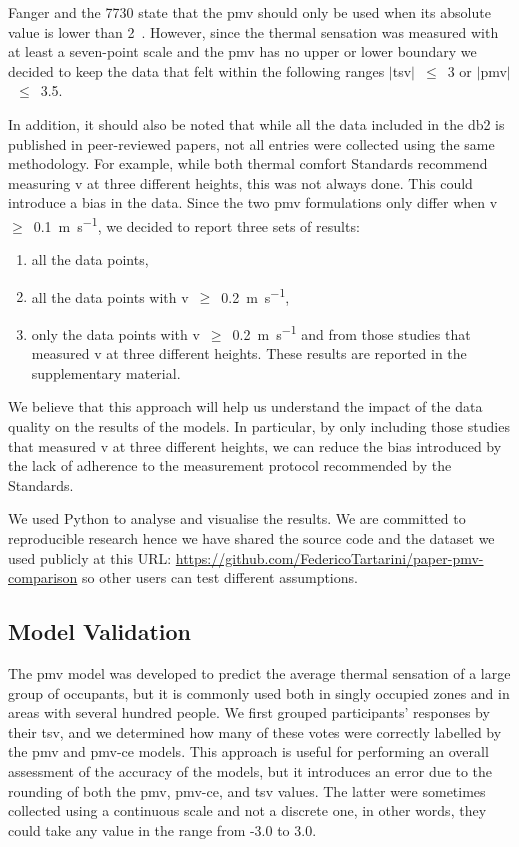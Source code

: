 Fanger and the \gls{7730} state that the \ac{pmv} should only be used when its absolute value is lower than 2~\cite{Fanger1970, iso7730}.
However, since the thermal sensation was measured with at least a seven-point scale and the \ac{pmv} has no upper or lower boundary we decided to keep the data that felt within the following ranges $|$\ac{tsv}$|$~$\leq$~\num{3} or $|$\ac{pmv}$|$~$\leq$~\num{3.5}.

In addition, it should also be noted that while all the data included in the \ac{db2} is published in peer-reviewed papers, not all entries were collected using the same methodology.
For example, while both thermal comfort Standards recommend measuring \ac{v} at three different heights, this was not always done.
This could introduce a bias in the data.
Since the two \ac{pmv} formulations only differ when \ac{v}~$\geq$~\qty{0.1}{\m\per\s}, we decided to report three sets of results:
\begin{enumerate}
    \item all the data points,
    \item all the data points with \ac{v}~$\geq$~\qty{0.2}{\m\per\s},
    \item only the data points with \ac{v}~$\geq$~\qty{0.2}{\m\per\s} and from those studies that measured \ac{v} at three different heights.
    These results are reported in the supplementary material.
\end{enumerate}
We believe that this approach will help us understand the impact of the data quality on the results of the models.
In particular, by only including those studies that measured \ac{v} at three different heights, we can reduce the bias introduced by the lack of adherence to the measurement protocol recommended by the Standards.

We used Python to analyse and visualise the results.
We are committed to reproducible research hence we have shared the source code and the dataset we used publicly at this URL: \url{https://github.com/FedericoTartarini/paper-pmv-comparison} so other users can test different assumptions.

\subsection{Model Validation}\label{subsec:model-validation}
The \ac{pmv} model was developed to predict the average thermal sensation of a large group of occupants, but it is commonly used both in singly occupied zones and in areas with several hundred people.
We first grouped participants' responses by their \ac{tsv}, and we determined how many of these votes were correctly labelled by the \ac{pmv} and \ac{pmv-ce} models.
This approach is useful for performing an overall assessment of the accuracy of the models, but it introduces an error due to the rounding of both the \ac{pmv}, \ac{pmv-ce}, and \ac{tsv} values.
The latter were sometimes collected using a continuous scale and not a discrete one, in other words, they could take any value in the range from -3.0 to 3.0.

